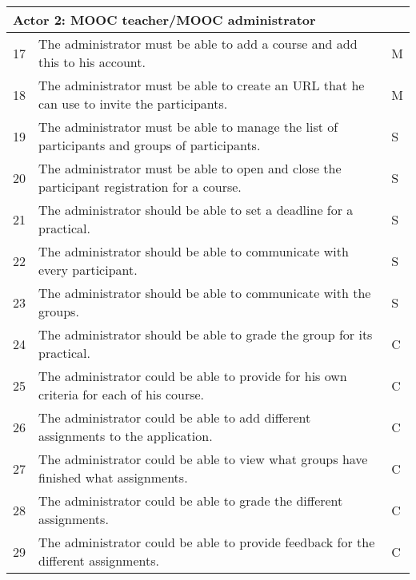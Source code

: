 \begin{tabular}{ | p{0.5cm} | p{12cm} | p{2cm} | }
\hline
\multicolumn{3}{|p{14.5cm}|}{\textbf{Actor 2: MOOC teacher/MOOC administrator}} \\ \hline
17 & The administrator must be able to add a course and add this to his account. & M \\ \hline
18 & The administrator must be able to create an URL that he can use to invite the participants. & M \\ \hline
19 & The administrator must be able to manage the list of participants and groups of participants. & S \\ \hline
20 & The administrator must be able to open and close the participant registration for a course. & S \\ \hline
21 & The administrator should be able to set a deadline for a practical. & S \\ \hline
22 & The administrator should be able to communicate with every participant. & S \\ \hline
23 & The administrator should be able to communicate with the groups. & S \\ \hline
24 & The administrator should be able to grade the group for its practical. & C \\ \hline
25 & The administrator could be able to provide for his own criteria for each of his course. & C \\ \hline
26 & The administrator could be able to add different assignments to the application. & C \\ \hline
27 & The administrator could be able to view what groups have finished what assignments. & C \\ \hline
28 & The administrator could be able to grade the different assignments. & C \\ \hline
29 & The administrator could be able to provide feedback for the different assignments. & C \\ \hline
\end{tabular}
